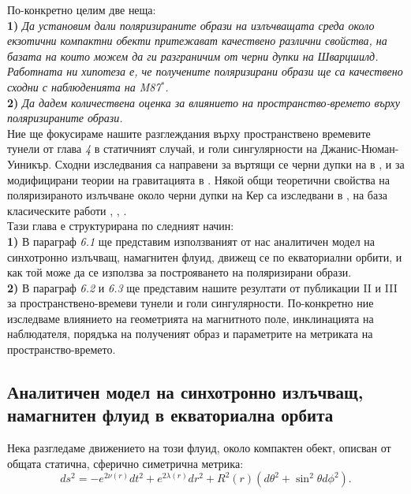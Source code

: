 По-конкретно целим две неща: \\

\textbf{1)} \emph{Да установим дали поляризираните образи на излъчващата среда около екзотични компактни обекти притежават качествено различни свойства, на базата на които можем да ги разграничим от черни дупки на Шварцшилд. Работната ни хипотеза е, че получените поляризирани образи ще са качествено сходни с наблюденията на M87$^*$.}\\

\textbf{2)} \emph{Да дадем количествена оценка за влиянието на пространство-времето върху поляризираните образи.}\\

Ние ще фокусираме нашите разглеждания върху пространствено времевите тунели от глава \emph{4} в статичният случай, и голи сингулярности на Джанис-Нюман-Уиникър. Сходни изследвания са направени за въртящи се черни дупки на  в \cite{Gelles2021}, и за модифицирани теории на гравитацията в \cite{Qin2021}. Някой общи теоретични свойства на поляризираното излъчване около черни дупки на Кер са изследвани в \cite{Himwich2020}, на база класическите работи \cite{Luminet1979}, \cite{Connors1980}, \cite{Chen1991}.\\

Тази глава е структурирана по следният начин: \\

\textbf{1)} В параграф \emph{6.1} ще представим използваният от нас аналитичен модел на синхотронно излъчващ, намагнитен флуид, движещ се по екваториални орбити, и как той може да се използва за построяването на поляризирани образи.\\

\textbf{2)} В параграф \emph{6.2} и \emph{6.3} ще представим нашите резултати от публикации II и III за пространствено-времеви тунели и голи сингулярности. По-конкретно ние изследваме влиянието на геометрията на магнитното поле, инклинацията на наблюдателя, порядъка на полученият образ и параметрите на метриката на пространство-времето.\\

\subsection{Аналитичен модел на синхотронно излъчващ, намагнитен флуид в екваториална орбита}

Нека разгледаме движението на този флуид, около компактен обект, описван от общата статична, сферично симетрична метрика:
\begin{equation}
	ds^2 = - e^{2\nu(r)}dt^2 + e^{2\lambda(r)}dr^2 + R^2(r)\left(d\theta^2 + \sin^2\theta d\phi^2\right).
\end{equation}


